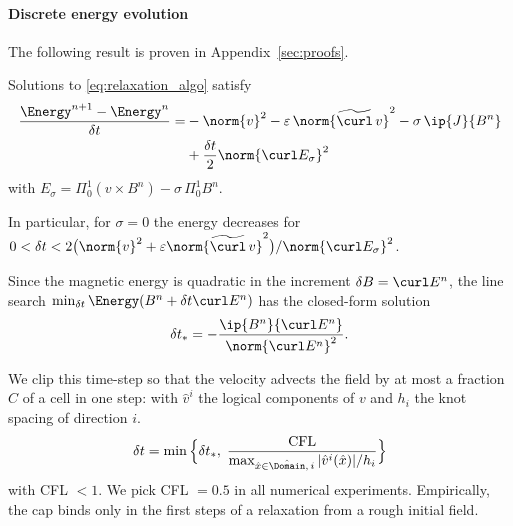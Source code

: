\documentclass[%
 reprint,
 superscriptaddress,
 amsmath,amssymb,
 aps, nofootinbib, floatfix]{revtex4-2}
\begin{document}
\paragraph{Discrete energy evolution}
The following result is proven in Appendix~\ref{sec:proofs}.

\begin{proposition}
    \label{prop:energy_dissipation}
    Solutions to \eqref{eq:relaxation_algo} satisfy
    \begin{align}
        \frac{\Energy^{n+1} - \Energy^{n}}{\delta t} = &- \norm{v}^2 - \varepsilon \, \norm{\widetilde{\curl} \, v}^2 - \sigma \, \ip{J}{B^n} \notag \\
        &+ \frac{\delta t}{2} \norm{\curl E_\sigma}^2
    \end{align}
    with $E_\sigma = \Pi^1_0 (v \times B^n) - \sigma \, \Pi^1_0 B^n$.
    
    In particular, for $\sigma = 0$ the energy decreases for $0 < \delta t < 2 \big( \norm{v}^2 + \varepsilon \norm{\widetilde{\curl} \, v}^2 \big) / \norm{\curl E_\sigma}^2$.
\end{proposition}

\begin{lemma}
    \label{lem:line_search}
    Since the magnetic energy is quadratic in the increment $\delta B = \curl E^n$, the line search $\min_{\delta t} \Energy(B^n + \delta t \curl E^n)$ has the closed-form solution
\begin{align}
    \label{eq:line_search}
    \delta t_* = -\frac{\ip{B^n}{\curl E^n}}{\norm{\curl E^n}^2} .
\end{align}
\end{lemma}

We clip this time-step so that the velocity advects the field by at most a fraction $C$ of a cell in one step: with $\hat v^i$ the logical components of $v$ and $h_i$ the knot spacing of direction $i$.
\begin{align}
\label{eq:CFL}
    \delta t = \min \Big\{ \delta t_*, \; \frac{\mathrm{CFL}}{\max_{\hat x \in \hat \Domain,\, i} |\hat v^i(\hat x)| / h_i} \Big\}
\end{align}
with CFL $< 1$. We pick CFL $= 0.5$ in all numerical experiments. Empirically, the cap binds only in the first steps of a relaxation from a rough initial field.
\end{document}
